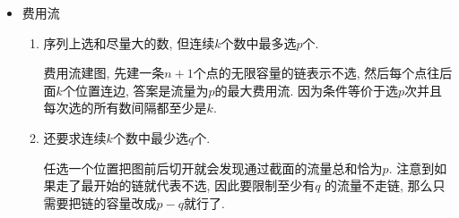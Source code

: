 \begin{itemize}








\item 费用流

\begin{enumerate}

\item 序列上选和尽量大的数, 但连续$k$个数中最多选$p$个.

费用流建图, 先建一条$n+1$个点的无限容量的链表示不选, 然后每个点往后面$k$个位置连边, 答案是流量为$p$的最大费用流. 因为条件等价于选$p$次并且每次选的所有数间隔都至少是$k$.

\item 还要求连续$k$个数中最少选$q$个.

任选一个位置把图前后切开就会发现通过截面的流量总和恰为$p$. 注意到如果走了最开始的链就代表不选, 因此要限制至少有$q$
的流量不走链, 那么只需要把链的容量改成$p - q$就行了.

\end{enumerate}

\end{itemize}